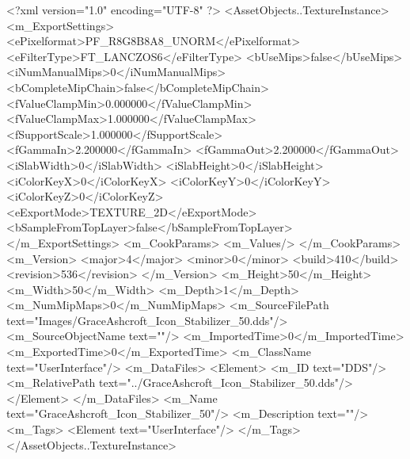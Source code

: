 <?xml version="1.0" encoding="UTF-8" ?>
<AssetObjects..TextureInstance>
	<m_ExportSettings>
		<ePixelformat>PF_R8G8B8A8_UNORM</ePixelformat>
		<eFilterType>FT_LANCZOS6</eFilterType>
		<bUseMips>false</bUseMips>
		<iNumManualMips>0</iNumManualMips>
		<bCompleteMipChain>false</bCompleteMipChain>
		<fValueClampMin>0.000000</fValueClampMin>
		<fValueClampMax>1.000000</fValueClampMax>
		<fSupportScale>1.000000</fSupportScale>
		<fGammaIn>2.200000</fGammaIn>
		<fGammaOut>2.200000</fGammaOut>
		<iSlabWidth>0</iSlabWidth>
		<iSlabHeight>0</iSlabHeight>
		<iColorKeyX>0</iColorKeyX>
		<iColorKeyY>0</iColorKeyY>
		<iColorKeyZ>0</iColorKeyZ>
		<eExportMode>TEXTURE_2D</eExportMode>
		<bSampleFromTopLayer>false</bSampleFromTopLayer>
	</m_ExportSettings>
	<m_CookParams>
		<m_Values/>
	</m_CookParams>
	<m_Version>
		<major>4</major>
		<minor>0</minor>
		<build>410</build>
		<revision>536</revision>
	</m_Version>
	<m_Height>50</m_Height>
	<m_Width>50</m_Width>
	<m_Depth>1</m_Depth>
	<m_NumMipMaps>0</m_NumMipMaps>
	<m_SourceFilePath text="Images/GraceAshcroft_Icon_Stabilizer_50.dds"/>
	<m_SourceObjectName text=""/>
	<m_ImportedTime>0</m_ImportedTime>
	<m_ExportedTime>0</m_ExportedTime>
	<m_ClassName text="UserInterface"/>
	<m_DataFiles>
		<Element>
			<m_ID text="DDS"/>
			<m_RelativePath text="../GraceAshcroft_Icon_Stabilizer_50.dds"/>
		</Element>
	</m_DataFiles>
	<m_Name text="GraceAshcroft_Icon_Stabilizer_50"/>
	<m_Description text=""/>
	<m_Tags>
		<Element text="UserInterface"/>
	</m_Tags>
</AssetObjects..TextureInstance>
